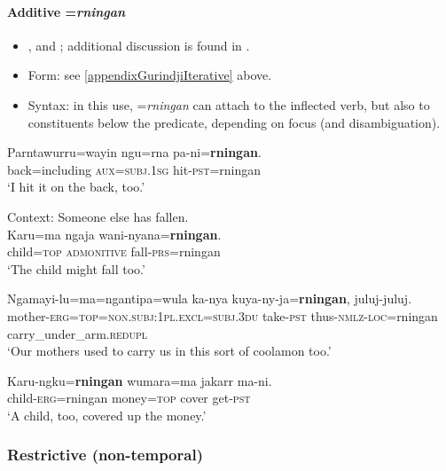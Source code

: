 \paragraph{Additive =\textit{rningan}}
\label{appendixGurindjiAdditive}
\begin{itemize}
	\item \textcite{McConvell1983}, \textcite[597–598]{MeakinsMcConvell2021} and \textcite[s.v. \textit{rningan}]{MeakinsEtAl2013}; additional discussion is found in \textcite{SchultzeBerndt2002}.
	\item Form: see \ref{appendixGurindjiIterative} above.
	\item Syntax: in this use, \mbox{=\textit{rningan}} can attach to the inflected verb, but also to constituents below the predicate, depending on focus (and disambiguation).
\end{itemize}
\begin{exe}
	\ex
	\gll Parntawurru=wayin ngu=rna pa-ni=\textbf{rningan}.\\
	back=including \textsc{aux}=\textsc{subj}.1\textsc{sg} hit-\textsc{pst}=rningan\\
	\glt \lq I hit it on the back, too.' \parencite[8]{McConvell1983}

	\ex Context: Someone else has fallen.\\
	\gll Karu=ma ngaja wani-nyana=\textbf{rningan}.\\
	child=\textsc{top} \textsc{admonitive} fall-\textsc{prs}=rningan\\
	\glt \lq The child might fall too.' \parencite[8]{McConvell1983}
		
	\ex
	\gll Ngamayi-lu=ma=ngantipa=wula ka-nya kuya-ny-ja=\textbf{rningan}, juluj-juluj.\\
	mother-\textsc{erg}=\textsc{top}=\textsc{non}.\textsc{subj}:1\textsc{pl}.\textsc{excl}=\textsc{subj}.3\textsc{du} take-\textsc{pst} thus-\textsc{nmlz}-\textsc{loc}=rningan carry\_under\_arm.\textsc{redupl}\\
	\glt \lq Our mothers used to carry us in this sort of coolamon too.\rq{ }\parencite[597]{MeakinsMcConvell2021}

	\ex
	\gll Karu-ngku=\textbf{rningan} wumara=ma jakarr ma-ni.\\
	child-\textsc{erg}=rningan money=\textsc{top} cover get-\textsc{pst}\\
	\glt \lq A child, too, covered up the money.' \parencite[7]{McConvell1983}
\end{exe}

\subsubsection{Restrictive (non-temporal)}
